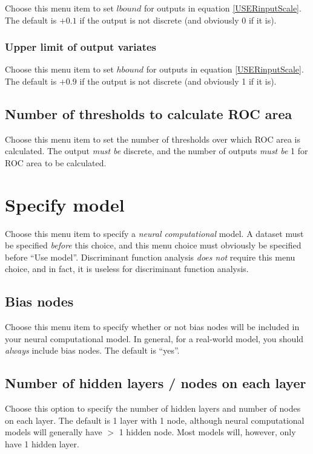 Choose this menu item to set $lbound$ for outputs in equation
\ref{USERinputScale}.  The default is $+0.1$ if the output is not discrete
(and obviously 0 if it is).

\subsubsection{Upper limit of output variates}

Choose this menu item to set $hbound$ for outputs in equation
\ref{USERinputScale}.  The default is $+0.9$ if the output is not discrete
(and obviously 1 if it is).

\subsection{Number of thresholds to calculate ROC area}

Choose this menu item to set the number of thresholds over which ROC
area is calculated.  The output {\em must be} discrete, and the number
of outputs {\em must be} 1 for ROC area to be calculated.

\section{Specify model}

Choose this menu item to specify a {\em neural computational} model.
A dataset must be specified {\em before} this choice, and this menu
choice must obviously be specified before ``Use model''.  Discriminant
function analysis {\em does not} require this menu choice, and in
fact, it is useless for discriminant function analysis.

\subsection{Bias nodes}

Choose this menu item to specify whether or not bias nodes will be
included in your neural computational model.  In general, for a
real-world model, you should {\em always} include bias nodes.  The
default is ``yes''.

\subsection{Number of hidden layers / nodes on each layer}

Choose this option to specify the number of hidden layers and number
of nodes on each layer.  The default is 1 layer with 1 node, although
neural computational models will generally have $>$ 1 hidden node.
Most models will, however, only have 1 hidden layer.

